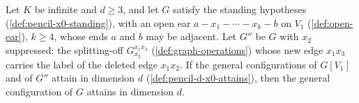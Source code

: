 \begin{theorem}
  \label{thm:pencil-d-open-ear-four}
  \leanok
  Let $K$ be infinite and $d \ge 3$, and let $G$ satisfy the standing
  hypotheses (\cref{def:pencil-x0-standing}), with an open ear
  $a - x_1 - \cdots - x_k - b$ on $V_1$ (\cref{def:open-ear}), $k \ge 4$,
  whose ends $a$ and $b$ may be adjacent. Let $G''$ be $G$ with $x_2$
  suppressed: the splitting-off $G_{x_2}^{x_1 x_3}$
  (\cref{def:graph-operations}) whose new edge $x_1 x_3$ carries the
  label of the deleted edge $x_1 x_2$. If the general configurations of
  $G[V_1]$ and of $G''$ attain in dimension $d$
  (\cref{def:pencil-d-x0-attains}), then the general configuration of $G$
  attains in dimension $d$.
\end{theorem}
